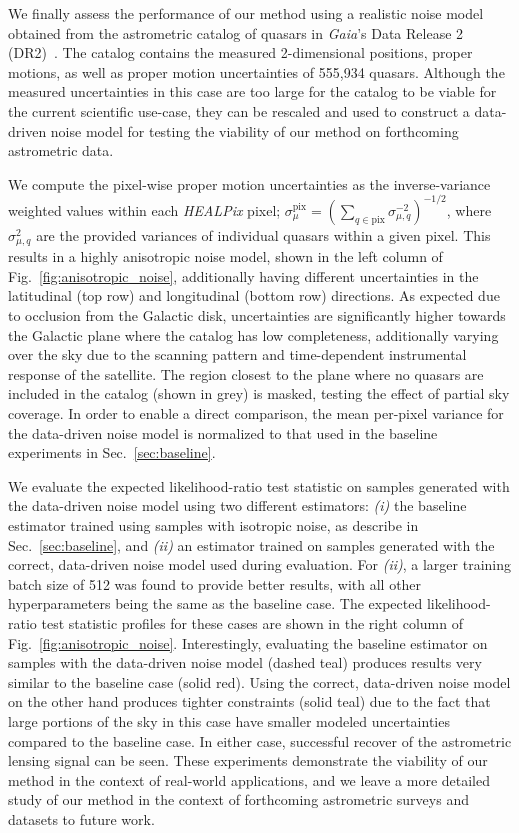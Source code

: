 \documentclass[twocolumn,linenumbers,anonymous]{aastex631}
\newcommand{\package}[1]{\textsl{#1}\xspace}
\newcommand{\healpix}{\package{HEALPix}}
\newcommand{\changes}[1]{{{\color{red}#1}}}
\begin{document}
\changes{We finally assess the performance of our method using a realistic noise model obtained from the astrometric catalog of quasars in \emph{Gaia}'s Data Release 2 (DR2)~\citep{2018A&A...616A...1G,2018A&A...616A...2L}. The catalog contains the measured 2-dimensional positions, proper motions, as well as proper motion uncertainties of 555,934 quasars. Although the measured uncertainties in this case are too large for the catalog to be viable for the current scientific use-case, they can be rescaled and used to construct a data-driven noise model for testing the viability of our method on forthcoming astrometric data.

We compute the pixel-wise proper motion uncertainties as the inverse-variance weighted values within each \healpix pixel; $\sigma_{\mu}^\mathrm{pix} = \left(\sum_{q\in\mathrm{pix}}\sigma_{\mu, q}^{-2}\right)^{-1/2}$, where $\sigma_{\mu, q}^{2}$ are the provided variances of individual quasars within a given pixel. This results in a highly anisotropic noise model, shown in the left column of Fig.~\ref{fig:anisotropic_noise}, additionally having different uncertainties in the latitudinal (top row) and longitudinal (bottom row) directions. As expected due to occlusion from the Galactic disk, uncertainties are significantly higher towards the Galactic plane where the catalog has low completeness, additionally varying over the sky due to the scanning pattern and time-dependent instrumental response of the satellite. The region closest to the plane where no quasars are included in the catalog (shown in grey) is masked, testing the effect of partial sky coverage. In order to enable a direct comparison, the mean per-pixel variance for the data-driven noise model is normalized to that used in the baseline experiments in Sec.~\ref{sec:baseline}.

We evaluate the expected likelihood-ratio test statistic on samples generated with the data-driven noise model using two different estimators: \emph{(i)} the baseline estimator trained using samples with isotropic noise, as describe in Sec.~\ref{sec:baseline}, and \emph{(ii)} an estimator trained on samples generated with the correct, data-driven noise model used during evaluation. For \emph{(ii)}, a larger training batch size of 512 was found to provide better results, with all other hyperparameters being the same as the baseline case. The expected likelihood-ratio test statistic profiles for these cases are shown in the right column of Fig.~\ref{fig:anisotropic_noise}. Interestingly, evaluating the baseline estimator on samples with the data-driven noise model (dashed teal) produces results very similar to the baseline case (solid red). Using the correct, data-driven noise model on the other hand produces tighter constraints (solid teal) due to the fact that large portions of the sky in this case have smaller modeled uncertainties compared to the baseline case. In either case, successful recover of the astrometric lensing signal can be seen. These experiments demonstrate the viability of our method in the context of real-world applications, and we leave a more detailed study of our method in the context of forthcoming astrometric surveys and datasets to future work.}
\end{document}
